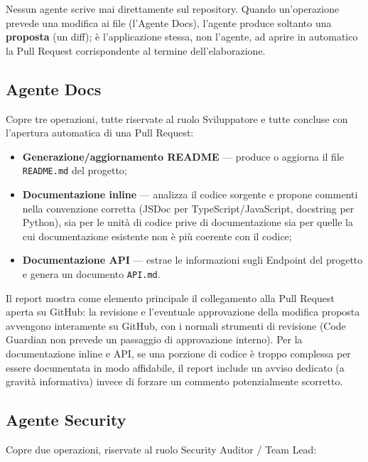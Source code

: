 \documentclass[11pt,a4paper]{article}
\newcommand{\code}[1]{\texttt{#1}}
\begin{document}
\begin{nota}
Nessun agente scrive mai direttamente sul repository. Quando un'operazione prevede una
modifica ai file (l'Agente Docs), l'agente produce soltanto una \textbf{proposta} (un diff);
è l'applicazione stessa, non l'agente, ad aprire in automatico la Pull Request corrispondente
al termine dell'elaborazione.
\end{nota}

\subsection{Agente Docs}

Copre tre operazioni, tutte riservate al ruolo Sviluppatore e tutte concluse con l'apertura
automatica di una Pull Request:

\begin{itemize}
  \item \textbf{Generazione/aggiornamento README} --- produce o aggiorna il file
        \code{README.md} del progetto;
  \item \textbf{Documentazione inline} --- analizza il codice sorgente e propone commenti
        nella convenzione corretta (JSDoc per TypeScript/JavaScript, docstring per Python),
        sia per le unità di codice prive di documentazione sia per quelle la cui
        documentazione esistente non è più coerente con il codice;
  \item \textbf{Documentazione API} --- estrae le informazioni sugli Endpoint del progetto
        e genera un documento \code{API.md}.
\end{itemize}

Il report mostra come elemento principale il collegamento alla Pull Request aperta su
GitHub: la revisione e l'eventuale approvazione della modifica proposta avvengono
interamente su GitHub, con i normali strumenti di revisione (Code Guardian non prevede un
passaggio di approvazione interno). Per la documentazione inline e API, se una porzione di
codice è troppo complessa per essere documentata in modo affidabile, il report include un
avviso dedicato (a gravità informativa) invece di forzare un commento potenzialmente
scorretto.

\subsection{Agente Security}

Copre due operazioni, riservate al ruolo Security Auditor / Team Lead:
\end{document}
